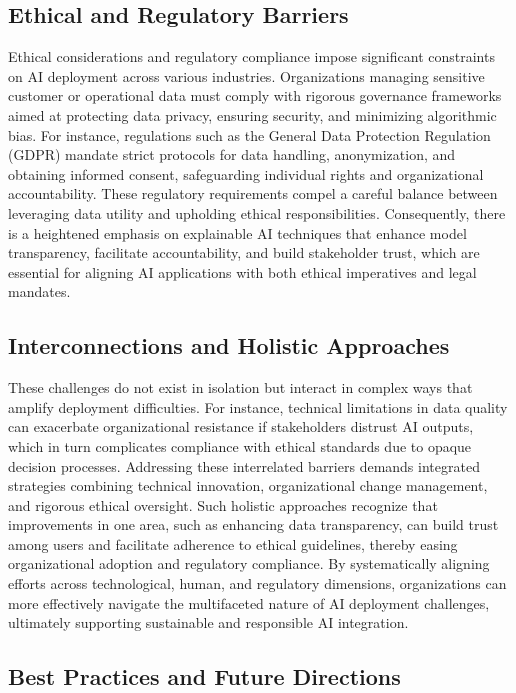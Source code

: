 \documentclass[sigconf]{acmart}
\begin{document}
\subsection{Ethical and Regulatory Barriers}

Ethical considerations and regulatory compliance impose significant constraints on AI deployment across various industries. Organizations managing sensitive customer or operational data must comply with rigorous governance frameworks aimed at protecting data privacy, ensuring security, and minimizing algorithmic bias. For instance, regulations such as the General Data Protection Regulation (GDPR) mandate strict protocols for data handling, anonymization, and obtaining informed consent, safeguarding individual rights and organizational accountability. These regulatory requirements compel a careful balance between leveraging data utility and upholding ethical responsibilities. Consequently, there is a heightened emphasis on explainable AI techniques that enhance model transparency, facilitate accountability, and build stakeholder trust, which are essential for aligning AI applications with both ethical imperatives and legal mandates.

\subsection{Interconnections and Holistic Approaches}

These challenges do not exist in isolation but interact in complex ways that amplify deployment difficulties. For instance, technical limitations in data quality can exacerbate organizational resistance if stakeholders distrust AI outputs, which in turn complicates compliance with ethical standards due to opaque decision processes. Addressing these interrelated barriers demands integrated strategies combining technical innovation, organizational change management, and rigorous ethical oversight. Such holistic approaches recognize that improvements in one area, such as enhancing data transparency, can build trust among users and facilitate adherence to ethical guidelines, thereby easing organizational adoption and regulatory compliance. By systematically aligning efforts across technological, human, and regulatory dimensions, organizations can more effectively navigate the multifaceted nature of AI deployment challenges, ultimately supporting sustainable and responsible AI integration.

\subsection{Best Practices and Future Directions}
\end{document}
